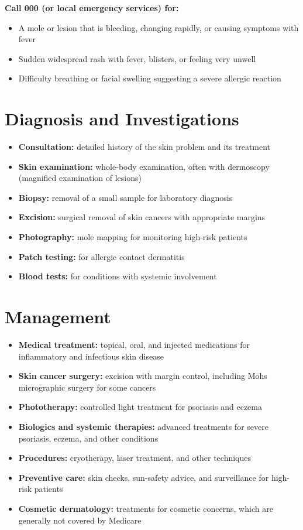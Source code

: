 \textbf{Call 000 (or local emergency services) for:}
\begin{itemize}
    \item A mole or lesion that is bleeding, changing rapidly, or causing symptoms with fever
    \item Sudden widespread rash with fever, blisters, or feeling very unwell
    \item Difficulty breathing or facial swelling suggesting a severe allergic reaction
\end{itemize}

\section*{Diagnosis and Investigations}
\begin{itemize}
    \item \textbf{Consultation:} detailed history of the skin problem and its treatment
    \item \textbf{Skin examination:} whole-body examination, often with dermoscopy (magnified examination of lesions)
    \item \textbf{Biopsy:} removal of a small sample for laboratory diagnosis
    \item \textbf{Excision:} surgical removal of skin cancers with appropriate margins
    \item \textbf{Photography:} mole mapping for monitoring high-risk patients
    \item \textbf{Patch testing:} for allergic contact dermatitis
    \item \textbf{Blood tests:} for conditions with systemic involvement
\end{itemize}

\section*{Management}
\begin{itemize}
    \item \textbf{Medical treatment:} topical, oral, and injected medications for inflammatory and infectious skin disease
    \item \textbf{Skin cancer surgery:} excision with margin control, including Mohs micrographic surgery for some cancers
    \item \textbf{Phototherapy:} controlled light treatment for psoriasis and eczema
    \item \textbf{Biologics and systemic therapies:} advanced treatments for severe psoriasis, eczema, and other conditions
    \item \textbf{Procedures:} cryotherapy, laser treatment, and other techniques
    \item \textbf{Preventive care:} skin checks, sun-safety advice, and surveillance for high-risk patients
    \item \textbf{Cosmetic dermatology:} treatments for cosmetic concerns, which are generally not covered by Medicare
\end{itemize}

